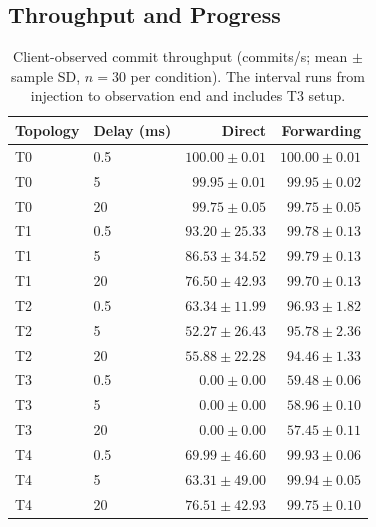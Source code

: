 
\subsection{Throughput and Progress}

\begin{table}[H]
  \centering
  \caption{Client-observed commit throughput (commits/s; mean $\pm$ sample SD, $n=30$ per condition). The interval runs from injection to observation end and includes T3 setup.}
  \label{tab:throughput}
  \begin{tabular}{llrr}
    \toprule
    Topology & Delay (ms) & Direct & Forwarding \\
    \midrule
    T0 & 0.5 & \(100.00 \pm 0.01\) & \(100.00 \pm 0.01\) \\
    T0 & 5 & \(99.95 \pm 0.01\) & \(99.95 \pm 0.02\) \\
    T0 & 20 & \(99.75 \pm 0.05\) & \(99.75 \pm 0.05\) \\
    T1 & 0.5 & \(93.20 \pm 25.33\) & \(99.78 \pm 0.13\) \\
    T1 & 5 & \(86.53 \pm 34.52\) & \(99.79 \pm 0.13\) \\
    T1 & 20 & \(76.50 \pm 42.93\) & \(99.70 \pm 0.13\) \\
    T2 & 0.5 & \(63.34 \pm 11.99\) & \(96.93 \pm 1.82\) \\
    T2 & 5 & \(52.27 \pm 26.43\) & \(95.78 \pm 2.36\) \\
    T2 & 20 & \(55.88 \pm 22.28\) & \(94.46 \pm 1.33\) \\
    T3 & 0.5 & \(0.00 \pm 0.00\) & \(59.48 \pm 0.06\) \\
    T3 & 5 & \(0.00 \pm 0.00\) & \(58.96 \pm 0.10\) \\
    T3 & 20 & \(0.00 \pm 0.00\) & \(57.45 \pm 0.11\) \\
    T4 & 0.5 & \(69.99 \pm 46.60\) & \(99.93 \pm 0.06\) \\
    T4 & 5 & \(63.31 \pm 49.00\) & \(99.94 \pm 0.05\) \\
    T4 & 20 & \(76.51 \pm 42.93\) & \(99.75 \pm 0.10\) \\
    \bottomrule
  \end{tabular}
\end{table}

